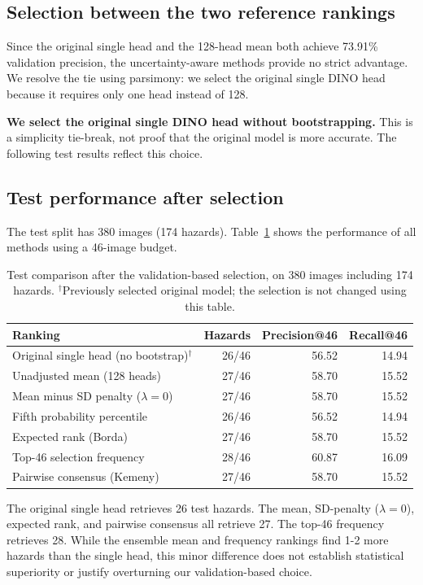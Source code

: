 \documentclass[10pt,a4paper]{article}
\begin{document}
\subsection{Selection between the two reference rankings}
\label{sec:selection}
Since the original single head and the 128-head mean both achieve 73.91\% validation precision, the uncertainty-aware methods provide no strict advantage. We resolve the tie using parsimony: we select the original single DINO head because it requires only one head instead of 128.

\textbf{We select the original single DINO head without bootstrapping.} This is a simplicity tie-break, not proof that the original model is more accurate. The following test results reflect this choice.

\subsection{Test performance after selection}
\label{sec:test}
The test split has 380 images (174 hazards). Table~\ref{tab:test} shows the performance of all methods using a 46-image budget.
\begin{table}[H]
\centering
\caption{Test comparison after the validation-based selection, on 380 images including 174 hazards. $^{\dagger}$Previously selected original model; the selection is not changed using this table.}
\label{tab:test}
\small
\begin{tabular}{lrrr}
\toprule
Ranking & Hazards & Precision@46 & Recall@46 \\
\midrule
Original single head (no bootstrap)$^{\dagger}$ & 26/46 & 56.52 & 14.94 \\
Unadjusted mean (128 heads) & 27/46 & 58.70 & 15.52 \\
Mean minus SD penalty ($\lambda=0$) & 27/46 & 58.70 & 15.52 \\
Fifth probability percentile & 26/46 & 56.52 & 14.94 \\
Expected rank (Borda) & 27/46 & 58.70 & 15.52 \\
Top-46 selection frequency & 28/46 & 60.87 & 16.09 \\
Pairwise consensus (Kemeny) & 27/46 & 58.70 & 15.52 \\
\bottomrule
\end{tabular}
\end{table}

The original single head retrieves 26 test hazards. The mean, SD-penalty ($\lambda=0$), expected rank, and pairwise consensus all retrieve 27. The top-46 frequency retrieves 28. While the ensemble mean and frequency rankings find 1-2 more hazards than the single head, this minor difference does not establish statistical superiority or justify overturning our validation-based choice.
\end{document}
